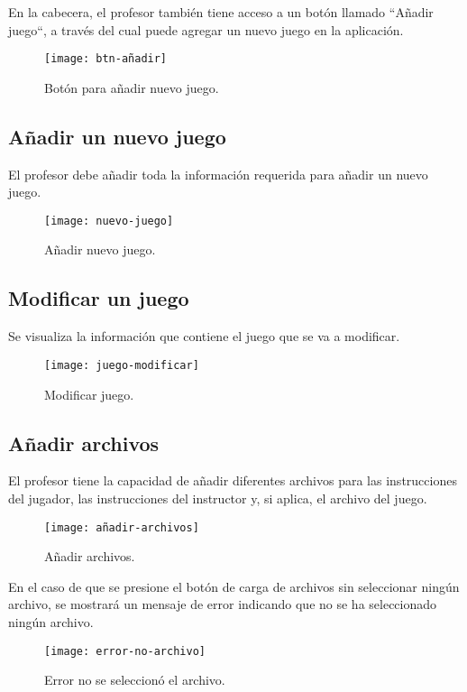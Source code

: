 En la cabecera, el profesor también tiene acceso a un botón llamado ``Añadir juego``, a través del cual puede agregar un nuevo juego en la aplicación.

\begin{figure}[htb]
\centering
\texttt{[image: btn-añadir]}
\caption{Botón para añadir nuevo juego.}
\label{fig:btn-añadir}
\end{figure}

\subsection{Añadir un nuevo juego}
El profesor debe añadir toda la información requerida para añadir un nuevo juego.

\begin{figure}[htb]
\centering
\texttt{[image: nuevo-juego]}
\caption{Añadir nuevo juego.}
\label{fig:nuevo-juego}
\end{figure}
\newpage
\subsection{Modificar un juego}
Se visualiza la información que contiene el juego que se va a modificar.
\begin{figure}[htb]
\centering
\texttt{[image: juego-modificar]}
\caption{Modificar juego.}
\label{fig:juego-modificar}
\end{figure}
\newpage

\subsection{Añadir archivos}
El profesor tiene la capacidad de añadir diferentes archivos para las instrucciones del jugador, las instrucciones del instructor y, si aplica, el archivo del juego.
\begin{figure}[htb]
\centering
\texttt{[image: añadir-archivos]}
\caption{Añadir archivos.}
\label{fig:añadir-archivos}
\end{figure}

En el caso de que se presione el botón de carga de archivos sin seleccionar ningún archivo, se mostrará un mensaje de error indicando que no se ha seleccionado ningún archivo.
\begin{figure}[htb]
\centering
\texttt{[image: error-no-archivo]}
\caption{Error no se seleccionó el archivo.}
\label{fig:error-no-archivo}
\end{figure}

